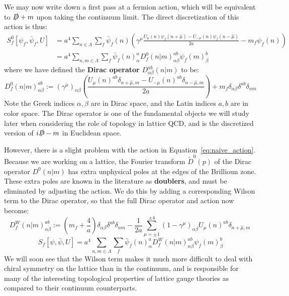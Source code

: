 \documentclass[11pt, oneside]{article}   	%
\theoremstyle{definition}
\begin{document}
We may now write down a first pass at a fermion action, which will be equivalent to $\slashed D + m$ upon taking the 
continuum limit. The direct discretization of this action is thus:
\begin{align}
	S_f^0[\psi_f, \bar\psi_f, U] &= a^4\sum_{n\in\Lambda}\sum_f \bar\psi_f(n)\left(\gamma^\mu\frac{U_\mu(n)\psi_f(n + \hat\mu) - U_{-\mu}(n)\psi_f(n - \hat\mu)}{2a} - m_f\psi_f(n)\right) 
	\\
	&= a^4\sum_{n, m\in\Lambda}\sum_f \bar\psi_f(n)_{\alpha}^a D_{f}^0(n | m)_{\alpha\beta}^{ab}\psi_f(m)_{\beta}^b~
	\label{eq:naive_action}
\end{align}
where we have defined the \textbf{Dirac operator} $D_{\alpha\beta}^{ab}(n | m)$ to be:
\begin{equation}
	D_f^0(n | m)_{\alpha\beta}^{ab} := (\gamma^\mu)_{\alpha\beta} \left(\frac{U_\mu(n)^{ab} \delta_{n + \hat\mu, m} - U_{-\mu}(n)^{ab} \delta_{n - \hat{\mu}, m}}{2a}\right) 
	+ m_f\delta_{\alpha\beta}\delta^{ab}\delta_{nm}
\end{equation}
Note the Greek indices $\alpha, \beta$ are in Dirac space, and the Latin indices $a, b$ are in color space. The Dirac operator 
is one of the fundamental objects we will study later when considering the role of topology in lattice QCD, and is the discretized 
version of $i\slashed D - m$ in Euclidean space. 

However, there is a slight problem with the action in Equation~\ref{eq:naive_action}. Because we are working on a lattice, the 
Fourier transform $\tilde D^0(p)$ of the Dirac operator $D^0(n | m)$ has extra unphysical poles at the edges of the Brillioun 
zone. These extra poles are known in the literature as \textbf{doublers}, and must be eliminated by adjusting the action. We do 
this by adding a corresponding Wilson term to the Dirac operator, so that the full Dirac operator and action now become:
\begin{equation}
	D_f^W(n | m)_{\alpha\beta}^{ab} := \left(m_f + \frac{4}{a}\right)\delta_{\alpha\beta}\delta^{ab}\delta_{nm} - 
	\frac{1}{2a}\sum_{\mu = \pm 1}^{\pm 4} (1 - \gamma^\mu)_{\alpha\beta} U_\mu(n)^{ab}\delta_{n + \hat{\mu}, m}~
	\label{eq:dirac_operator}
\end{equation}
\begin{equation}
	S_f[\psi, \bar\psi, U] = a^4\sum_{n, m\in\Lambda}\sum_f \bar\psi_f(n)_{\alpha}^a D_f^W(n | m)_{\alpha\beta}^{ab}\psi_f(m)_{\beta}^b
\end{equation}
We will soon see that the Wilson term makes it much more difficult to deal with chiral symmetry on the lattice than in the 
continuum, and is responsible for many of the interesting topological properties of lattice gauge theories as compared to their 
continuum counterparts. 
\end{document}
